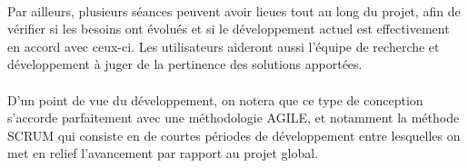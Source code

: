 \paragraph{}Par ailleurs, plusieurs séances peuvent avoir lieues tout au long du projet, afin de vérifier si les besoins ont évolués et si le développement actuel est effectivement en accord avec ceux-ci. Les utilisateurs aideront aussi l'équipe de recherche et développement à juger de la pertinence des solutions apportées.
\paragraph{}
D'un point de vue du développement, on notera que ce type de conception s'accorde parfaitement avec une méthodologie AGILE, et notamment la méthode SCRUM qui consiste en de courtes périodes de développement entre lesquelles on met en relief l'avancement par rapport au projet global.
